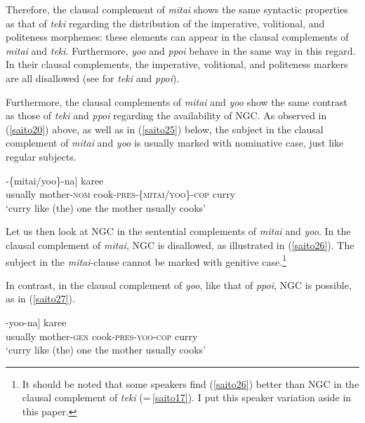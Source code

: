 \documentclass[output=paper]{langscibook}
\begin{document}
Therefore, the clausal complement of \emph{mitai} shows the same syntactic properties as that of \emph{teki} regarding the distribution of the imperative, volitional, and politeness morphemes: these elements can appear in the clausal complements of \emph{mitai} and \emph{teki}. Furthermore, \emph{yoo} and \emph{ppoi} behave in the same way in this regard. In their clausal complements, the imperative, volitional, and politeness markers are all disallowed (see  for \emph{teki} and \emph{ppoi}).

Furthermore, the clausal complements of \emph{mitai} and \emph{yoo} show the same contrast as those of \emph{teki} and \emph{ppoi} regarding the availability of NGC. As observed in (\ref{saito20}) above, as well as in (\ref{saito25}) below, the subject in the clausal complement of \emph{mitai} and \emph{yoo} is usually marked with nominative case, just like regular subjects.

\begin{exe}
\ex \label{saito25}
\gll [[{hudan} {okaasan-ga}   {tuku-ru}]-\{{mitai/yoo}\}-{na}] {karee}\\
usually mother-\textsc{nom} cook-\textsc{pres}-\{\textsc{mitai/yoo}\}-\textsc{cop} curry\\ 
\glt ‘curry like (the) one the mother usually cooks’
\end{exe}

Let us then look at NGC in the sentential complements of \emph{mitai} and \emph{yoo}. In the clausal complement of \emph{mitai}, NGC is disallowed, as illustrated in (\ref{saito26}). The subject in the \emph{mitai}-clause cannot be marked with genitive case.\footnote{It should be noted that some speakers find (\ref{saito26}) better than NGC in the clausal complement of \emph{teki} (=\,\ref{saito17}). I put this speaker variation aside in this paper.} 

\begin{exe}
\end{exe}

In contrast, in the clausal complement of \emph{yoo}, like that of \emph{ppoi}, NGC is possible, as in (\ref{saito27}).

\begin{exe}
\ex \label{saito27}
\gll [[{hudan} {okaasan-no} {tuku-ru}]-{yoo-na}] {karee}\\
usually mother-\textsc{gen} cook-\textsc{pres-yoo-cop} curry\\ 
\glt ‘curry like (the) one the mother usually cooks’
\end{exe}
\end{document}
